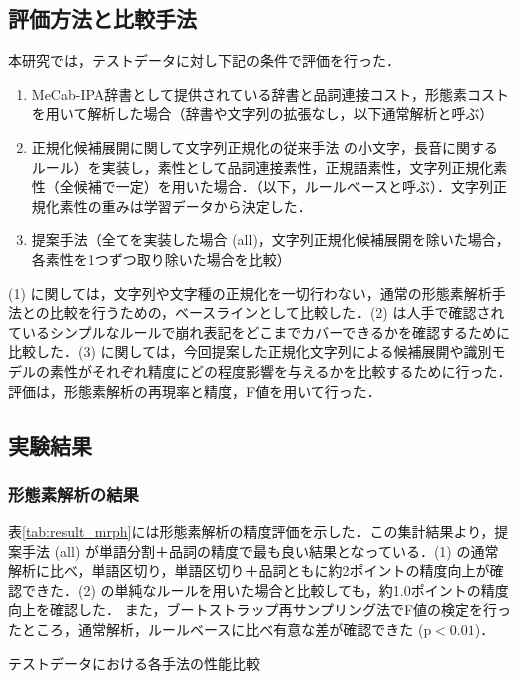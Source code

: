 \documentclass[japanese]{jnlp_1.4}
\begin{document}
\subsection{評価方法と比較手法}

本研究では，テストデータに対し下記の条件で評価を行った．

\begin{enumerate}
 \item MeCab-IPA辞書として提供されている辞書と品詞連接コスト，形態素コストを用いて解析した場合（辞書や文字列の拡張なし，以下通常解析と呼ぶ）
 \item 正規化候補展開に関して文字列正規化の従来手法 \cite{sasano2014} の小文字，長音に関するルール）を実装し，素性として品詞連接素性，正規語素性，文字列正規化素性（全候補で一定）を用いた場合．（以下，ルールベースと呼ぶ）．文字列正規化素性の重みは学習データから決定した．
 \item 提案手法（全てを実装した場合 (all)，文字列正規化候補展開を除いた場合，各素性を1つずつ取り除いた場合を比較）
\end{enumerate}
(1) に関しては，文字列や文字種の正規化を一切行わない，通常の形態素解析手法との比較を行うための，ベースラインとして比較した．(2) は人手で確認されているシンプルなルールで崩れ表記をどこまでカバーできるかを確認するために比較した．(3) に関しては，今回提案した正規化文字列による候補展開や識別モデルの素性がそれぞれ精度にどの程度影響を与えるかを比較するために行った．評価は，形態素解析の再現率と精度，F値を用いて行った．


\subsection{実験結果}

\subsubsection{形態素解析の結果}

表\ref{tab:result_mrph}には形態素解析の精度評価を示した．この集計結果より，提案手法 (all) が単語分割＋品詞の精度で最も良い結果となっている．(1) の通常解析に比べ，単語区切り，単語区切り＋品詞ともに約2ポイントの精度向上が確認できた．(2) の単純なルールを用いた場合と比較しても，約1.0ポイントの精度向上を確認した．
また，ブートストラップ再サンプリング法でF値の検定を行ったところ，通常解析，ルールベースに比べ有意な差が確認できた ($\mathrm{p} < 0.01$)．

\begin{table}[t]
\caption{テストデータにおける各手法の性能比較} 
\label{tab:result_mrph}

\end{table}
\end{document}
